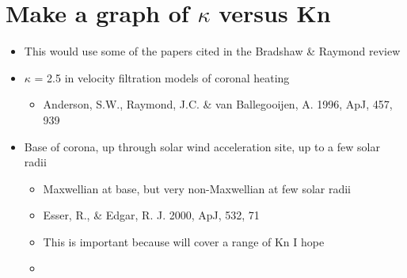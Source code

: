 \documentclass[11pt]{article}
\begin{document}
\section{Make a graph of \(\kappa\) versus Kn}
\label{sec:orgheadline24}


\begin{itemize}
\item This would use some of the papers cited in the Bradshaw \& Raymond review
\item \(\kappa\) = 2.5 in velocity filtration models of coronal heating
\begin{itemize}
\item Anderson, S.W., Raymond, J.C. \& van Ballegooijen, A. 1996, ApJ, 457, 939
\end{itemize}
\item Base of corona, up through solar wind acceleration site, up to a few solar radii
\begin{itemize}
\item Maxwellian at base, but very non-Maxwellian at few solar radii
\item Esser, R., \& Edgar, R. J. 2000, ApJ, 532, 71
\item This is important because will cover a range of Kn I hope
\item 
\end{itemize}
\end{itemize}
\end{document}
